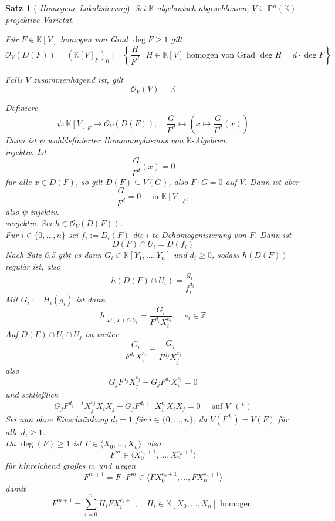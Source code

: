 \documentclass[11pt]{book}
\newtheorem{theorem}{Satz}[section]
\theoremstyle{nonumberbreak}
\newenvironment{pr}[1][]{\ifthenelse{\equal{#1}{}}{\proof}{\proof[#1]}\rm}{\endproof}
\begin{document}
\begin{spacing}{1.3}
\begin{theorem}[ \rm \it Homogene Lokalisierung]
Sei $\mathbb{K}$ algebraisch abgeschlossen, $V \subseteq \mathbb{P}^n(\mathbb{K})$ projektive Varietät.
\begin{compactenum}
\item Für $F \in \mathbb{K}[V]$ homogen von Grad $\deg F \geqslant 1$ gilt
$$\mathcal{O}_V(D(F)) = \left( \mathbb{K}[V]_F\right)_0 := \left\{ \frac{H}{F^d} \ \bigg \vert \ H \in \mathbb{K}[V] \textrm{ homogen von Grad } \deg H=d \cdot \deg F \right\}$$
\item Falls $V$ zusammenhägend ist, gilt
$$\mathcal{O}_V(V)= \mathbb{K}$$
\end{compactenum}
\begin{pr}
\begin{compactenum}
\item Definiere
$$\psi: \mathbb{K}[V]_F \longrightarrow \mathcal{O}_V(D(F)), \quad \frac{G}{F^d} \mapsto \left( x \mapsto \frac{G}{F^d}(x) \right)$$
Dann ist $\psi$ wohldefinierter Homomorphismus von $\mathbb{K}$-Algebren. \\
\textit{injektiv.} Ist 
$$\frac{G}{F^d}(x) = 0$$
für alle $x \in D(F)$, so gilt $D(F) \subseteq V(G)$, also $F \cdot G = 0$ auf $V$. Dann ist aber
$$\frac{G}{F^d}=0 \quad \textrm{ in } \mathbb{K}[V]_F,$$
also $\psi$ injektiv.\\
\textit{surjektiv.} Sei $h \in \mathcal{O}_V(D(F))$.\\
Für $i \in \{0, \ldots, n\}$ sei $f_i:=D_i(F)$ die $i$-te Dehomogenisierung von $F$. Dann ist
$$D(F) \cap U_i = D(f_i)$$
Nach Satz 6.5 gibt es dann $G_i \in \mathbb{K}[Y_1,\ldots, Y_n]$ und $d_i \geqslant 0$, sodass $h(D(F))$ regulär ist, also
$$h(D(F) \cap U_i) = \frac{g_i}{f_i^{d_i}}$$
Mit $G_i := H_i(g_i)$ ist dann
$$h \vert_{D(F) \cap U_i} = \frac{G_i}{F^{d_i} X_i^{e_i}}, \quad e_i \in \mathbb{Z}$$
Auf $D(F) \cap U_i \cap U_j$ ist weiter
$$\frac{G_i}{F^{d_i}X_i^{e_i}} = \frac{G_j}{F^{d_j} X_j^{e_j}}$$
also 
$$G_j F^{d_j} X_j^{e_j} - G_j F^{d_i} X_i^{e_i} =0$$
und schließlich
$$G_j F^{d_j+1} X_j^{e_j}X_i X_j - G_j F^{d_i +1 } X_i^{e_i}X_i X_j =0 \quad \textrm{ auf } V \ \ (*)$$
Sei nun ohne Einschränkung $d_i=1$ für $i \in \{0, \ldots, n \}$, da $V(F^{d_i}) = V(F)$ für alle $d_i \geqslant 1$.\\
Da $\deg(F) \geqslant 1$ ist $F \in \langle X_0, \ldots, X_n \rangle$, also 
$$F^m \in \langle X_0^{e_0+1}, \ldots, X_n ^{e_n+1} \rangle$$
für hinreichend großes $m$ und wegen
$$F^{m+1} = F \cdot F^m \in \langle F X_0 ^{e_0+1}, \ldots, F X_n^{e_n+1} \rangle$$
damit
$$F^{m+1} = \sum_{i=0}^n H_i F X_i^{e_i +1 }, \quad H_i \in \mathbb{K}[X_0, \ldots, X_n] \textrm{ homogen }$$

\end{compactenum}
\end{pr}
\end{theorem}
\end{spacing}
\end{document}
